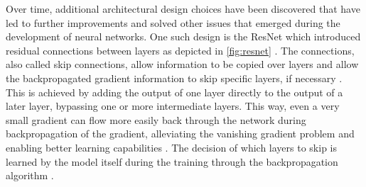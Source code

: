 Over time, additional architectural design choices have been discovered that have led to further improvements and solved other issues that emerged during the development of neural networks.
One such design is the ResNet \cite{he2016DeepResidualLearning} which introduced residual connections between layers as depicted in \autoref{fig:resnet} \cite{he2016DeepResidualLearning, aggarwal2018NeuralNetworksDeep}.
The connections, also called skip connections, allow information to be copied over layers and allow the backpropagated gradient information to skip specific layers, if necessary \cite{he2016DeepResidualLearning, aggarwal2018NeuralNetworksDeep}.
This is achieved by adding the output of one layer directly to the output of a later layer, bypassing one or more intermediate layers.
This way, even a very small gradient can flow more easily back through the network during backpropagation of the gradient, alleviating the vanishing gradient problem and enabling better learning capabilities \cite{he2016DeepResidualLearning, aggarwal2018NeuralNetworksDeep}.
The decision of which layers to skip is learned by the model itself during the training through the backpropagation algorithm \cite{he2016DeepResidualLearning, aggarwal2018NeuralNetworksDeep}.

